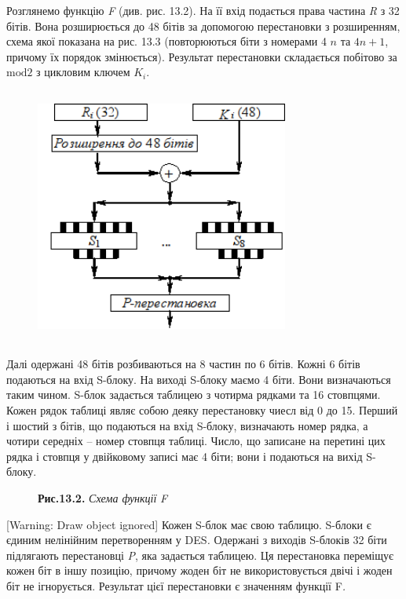 \documentclass[a4paper]{article}
\newcounter{}
\begin{document}
 Розглянемо функцію \textit{F} (див. рис. 13.2). На її вхід подається права
частина \textit{R}  з 32 бітів. Вона розширюється до 48 бітів за допомогою
перестановки з розширенням, схема якої показана на рис. 13.3 (повторюються біти
з номерами 4 ${n}$ та  ${4n+1}$, причому їх порядок змінюється). Результат
перестановки складається побітово за  ${\text{mod}2}$ з цикловим ключем 
${K_{{i}}}$. 

\begin{figure}
\centering
\includegraphics[width=3.2772in,height=3.3307in]{crypt-img/crypt-img296.png}
\end{figure}
Далі одержані 48 бітів розбиваються на 8 частин по 6 бітів. Кожні 6 бітів
подаються на вхід S-блоку. На виході S-блоку маємо 4 біти. Вони визначаються
таким чином. S-блок задається таблицею з чотирма рядками та 16 стовпцями. Кожен
рядок таблиці являє собою деяку перестановку чиесл від 0 до 15. Перший і шостий
з бітів, що подаються на вхід S-блоку, визначають номер рядка, а чотири
середніх – номер стовпця таблиці. Число, що записане на перетині цих рядка і
стовпця у двійковому записі має 4 біти; вони і подаються на вихід  S-блоку.

\begin{figure}
\centering
\begin{minipage}{2.1043in}
\textbf{Рис.13.2.}\textit{ Схема функції }\textit{F}
\end{minipage}
\end{figure}
[Warning: Draw object ignored] Кожен S-блок має свою таблицю.  S-блоки є єдиним
нелінійним перетворенням у DES\textit{.} Одержані з виходів S-блоків 32 біти
підлягають перестановці \textit{P}, яка задається таблицею. Ця перестановка
переміщує кожен біт в іншу позицію, причому жоден біт не використовується двічі
і жоден біт не ігнорується. Результат цієї перестановки є значенням функції
F\textit{.}
\end{document}
